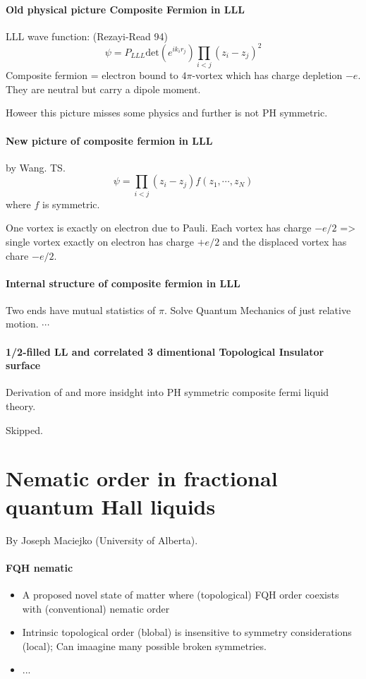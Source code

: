 \documentclass{article}
\numberwithin{equation}{subsection} %
\theoremstyle{definition}
\begin{document}
\paragraph{Old physical picture Composite Fermion in LLL}
LLL wave function: (Rezayi-Read 94)
$$ \psi= P_{LLL} \mathrm{det}(e^{ik_i r_j})\prod_{i<j} (z_i-z_j)^2 $$
Composite fermion = electron bound to $4\pi$-vortex which has charge
depletion $-e$. They are neutral but carry a dipole moment.

Howeer this picture misses some physics and further is not PH symmetric.

\paragraph{New picture of composite fermion in LLL}
by Wang. TS.
$$\psi=\prod_{i<j} (z_i-z_j)f(z_1,\cdots,z_N)$$
where $f$ is symmetric.

One vortex is exactly on electron due to Pauli. Each vortex has charge
$-e/2$ => single vortex exactly on electron has charge $+e/2$ and the
displaced vortex has chare $-e/2$.

\paragraph{Internal structure of composite fermion in LLL}
Two ends have mutual statistics of $\pi$. Solve Quantum Mechanics of just
relative motion. $\cdots$

\paragraph{1/2-filled LL and correlated 3 dimentional Topological
Insulator surface} Derivation of and more
insidght into PH symmetric composite fermi liquid theory.

Skipped.

\section{Nematic order in fractional quantum Hall liquids}
\label{sec:Nematic-order-in-fractional-quantum-Hall-liquids}
By Joseph Maciejko (University of Alberta).

\paragraph{FQH nematic}
\begin{itemize}
    \item A proposed novel state of matter where (topological) FQH order
        coexists with (conventional) nematic order
    \item Intrinsic topological order (blobal) is insensitive to symmetry
        considerations (local); Can imaagine many possible broken
        symmetries.
    \item ...
\end{itemize}
\end{document}
